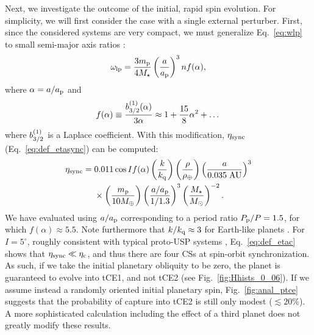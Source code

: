 \documentclass[
        fleqn,
        usenatbib,
        referee,
    ]{mnras}
\newcommand*{\p}[1]{\left(#1\right)}
\begin{document}
Next, we investigate the outcome of the initial, rapid spin evolution. For
simplicity, we will first consider the case with a single external perturber.
First, since the considered systems are very compact, we must generalize
Eq.~\eqref{eq:wlp} to small semi-major axis ratios \citep[see e.g.][]{lai_2017}:
\begin{equation}
    \omega_{\rm lp} = \frac{3m_{\rm p}}{4M_{\star}}
        \p{\frac{a}{a_{\rm p}}}^3 n f(\alpha),
        \label{eq:def_g_usp}
\end{equation}
where $\alpha = a / a_{\rm p}$ and
\begin{equation}
    f(\alpha) \equiv \frac{b_{\rm 3/2}^{(1)}(\alpha)}{3\alpha}
        \approx 1 + \frac{15}{8}\alpha^2 + \dots
\end{equation}
where $b_{\rm 3/2}^{(1)}$ is a Laplace coefficient. With this modification,
$\eta_{\rm sync}$ (Eq.~\ref{eq:def_etasync}) can be computed:
\begin{align}
    \eta_{\rm sync} ={}& 0.011 \cos I f(\alpha)
            \p{\frac{k}{k_{\rm q}}}
            \p{\frac{\rho}{\rho_{\oplus}}}
            \p{\frac{a}{0.035 \;\mathrm{AU}}}^{3}\nonumber\\
        &\times
            \p{\frac{m_{\rm p}}{10 M_{\oplus}}}
            \p{\frac{a / a_{\rm p}}{1/1.3}}^{3}
            \p{\frac{M_\star}{M_{\odot}}}^{-2}
            .\label{eq:etasync_usp}
\end{align}
We have evaluated using $a / a_{\rm p}$ corresponding to a period ratio $P_{\rm
p} / P = 1.5$, for which $f(\alpha) \approx 5.5$. Note furthermore that $k /
k_{\rm q} \approx 3$ for Earth-like planets \citep{groten2004fundamental,
lainey2016quantification}. For $I = 5^\circ$, roughly
consistent with typical proto-USP systems \citep{dai2018larger},
Eq.~\eqref{eq:def_etac} shows that $\eta_{\rm sync} \ll \eta_{\rm c}$, and thus
there are four CSs at spin-orbit synchronization. As such, if we take the
initial planetary obliquity to be zero, the planet is guaranteed to evolve into
tCE1, and not tCE2 (see Fig.~\ref{fig:Hhists_0_06}). If we assume instead a
randomly oriented initial planetary spin, Fig.~\ref{fig:anal_ptce} suggests that
the probability of capture into tCE2 is still only modest ($\lesssim 20\%$). A
more sophisticated calculation including the effect of a third planet does not
greatly modify these results.
\end{document}
